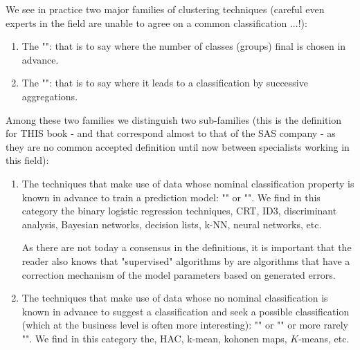 	We see in practice two major families of clustering techniques (careful even experts in the field are unable to agree on a common classification ...!):
	\begin{enumerate}
		\item The "": that is to say where the number of classes (groups) final is chosen in advance.

		\item The "": that is to say where it leads to a classification by successive aggregations.
	\end{enumerate}
	Among these two families we distinguish two sub-families (this is the definition for THIS book - and that correspond almost to that of the SAS company - as they are no common accepted definition until now between specialists working in this field):
	\begin{enumerate}
		\item The techniques that make use of data whose nominal classification property is known in advance to train a prediction model: "" or "". We find in this category the binary logistic regression techniques, CRT, ID3, discriminant analysis, Bayesian networks, decision lists, k-NN, neural networks, etc. 

		As there are not today a consensus in the definitions, it is important that the reader also knows that "supervised" algorithms by are algorithms that have a correction mechanism of the model parameters based on generated errors.
	
		\item The techniques that make use of data whose no nominal classification is known in advance to suggest a classification and seek a possible classification (which at the business level is often more interesting): "" or "" or more rarely "". We find in this category the, HAC, k-mean, kohonen maps, $K$-means, etc.
	\end{enumerate}
